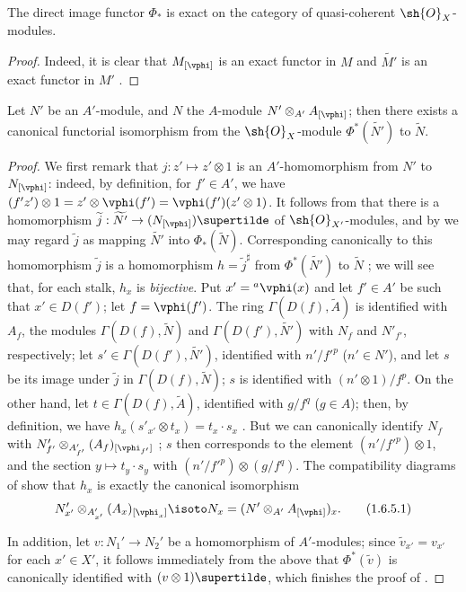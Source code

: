 \begin{corollary}[1.6.4]
\label{I.1.6.4}
The direct image functor $\Phi_*$ is exact on the category of quasi-coherent $\sh{O}_X$-modules.
\end{corollary}

\begin{proof}
Indeed, it is clear that $M_{[\vphi]}$ is an exact functor in $M$ and $\widetilde{M'}$ is an
exact functor in $M'$ .
\end{proof}

\begin{proposition}[1.6.5]
\label{I.1.6.5}
Let $N'$ be an $A'$-module, and $N$ the $A$-module $N'\otimes_{A'}A_{[\vphi]}$;
then there exists a canonical functorial isomorphism from the $\sh{O}_X$-module $\Phi^*(\widetilde{N'})$ to $\widetilde{N}$.
\end{proposition}

\begin{proof}
We first remark that $j:z'\mapsto z'\otimes 1$ is an $A'$-homomorphism from $N'$ to $N_{[\vphi]}$: indeed, by definition, for $f'\in A'$, we have $(f' z')\otimes 1=z'\otimes\vphi(f')=\vphi(f')(z'\otimes 1)$.
It follows from  that there is a homomorphism $\widetilde{j}:\widetilde{N'}\to(N_{[\vphi]})\supertilde$ of $\sh{O}_{X'}$-modules, and by  we may regard $\widetilde{j}$ as mapping $\widetilde{N'}$ into $\Phi_*(\widetilde{N})$.
Corresponding canonically to this homomorphism $\widetilde{j}$ is a homomorphism $h=\widetilde{j}^\sharp$ from $\Phi^*(\widetilde{N'})$ to $\widetilde{N}$ ;
we will see that, for each stalk, $h_x$ is \emph{bijective}.
Put $x'={}^a\vphi(x)$ and let $f'\in A'$ be such that $x'\in D(f')$;
let $f=\vphi(f')$.
The ring $\Gamma(D(f),\widetilde{A})$ is identified with $A_f$, the modules
$\Gamma(D(f),\widetilde{N})$ and $\Gamma(D(f'),\widetilde{N'})$ with $N_f$ and $N'_{f'}$, respectively;
let $s'\in\Gamma(D(f'),\widetilde{N'})$, identified with $n'/{f'}^p$ ($n'\in N'$), and let $s$ be its image under $\widetilde{j}$ in $\Gamma(D(f),\widetilde{N})$;
$s$ is identified with $(n'\otimes 1)/f^p$.
On the other hand, let $t\in\Gamma(D(f),\widetilde{A})$, identified with $g/f^q$ ($g\in A$);
then, by definition, we have $h_x(s'_{x'}\otimes t_x)=t_x\cdot s_x$ .
But we can canonically identify $N_f$ with $N'_{f'}\otimes_{A'_{f'}}(A_f)_{[\vphi_{f'}]}$ ;
$s$ then corresponds to the element $(n'/{f'}^p)\otimes 1$, and the section $y\mapsto t_y\cdot s_y$ with $(n'/{f'}^p)\otimes(g/f^q)$.
The compatibility diagrams of  show that $h_x$ is exactly the canonical isomorphism
\[
  \label{I.1.6.5.1}
  N'_{x'}\otimes_{A'_{x'}}(A_x)_{[\vphi_x]}\isoto N_x=(N'\otimes_{A'}A_{[\vphi]})_x.
  \tag{1.6.5.1}
\]

In addition, let $v:N_1'\to N_2'$ be a homomorphism of $A'$-modules;
since $\widetilde{v}_{x'}=v_{x'}$ for each $x'\in X'$, it follows immediately from the above that $\Phi^*(\widetilde{v})$ is canonically identified with $(v\otimes 1)\supertilde$, which finishes the proof of .
\end{proof}

